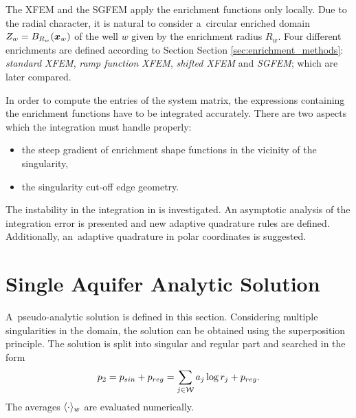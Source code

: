 The XFEM and the SGFEM apply the enrichment functions only locally. 
Due to the radial character, it is natural to consider a~circular enriched domain $Z_w = B_{R_w}(\mathbf{\boldsymbol{x}}_w)$
of the well $w$ given by the enrichment radius $R_w$.
Four different enrichments are defined according to Section Section \ref{sec:enrichment_methods}:
\emph{standard XFEM}, \emph{ramp function XFEM}, \emph{shifted XFEM} and \emph{SGFEM}; which are later compared.


In order to compute the entries of the system matrix, %
the expressions containing the enrichment functions have to be integrated accurately. 
% 
There are two aspects which the integration must handle properly:
\begin{itemize}
  \item the steep gradient of enrichment shape functions in the vicinity of the singularity,
  \item the singularity cut-off edge geometry.
\end{itemize}

The instability in the integration in \cite{gracie_modelling_2010} is investigated.
An asymptotic analysis of the integration error is presented and new adaptive quadrature rules are defined.
Additionally, an~adaptive quadrature in polar coordinates is suggested.

\section{Single Aquifer Analytic Solution} \label{sec:prim_analytic_solution}
A~pseudo-analytic solution is defined in this section. Considering multiple singularities in the domain,
the solution can be obtained using the superposition principle.
The solution is split into singular and regular part and searched in the form
\begin{equation}
p_2 = p_{sin} + p_{reg} = \sum\limits_{j\in\mathcal{W}} a_j\log r_j + p_{reg}. \label{eqn:2d_press_sol_mult}\\
\end{equation}
The averages $\langle\cdot\rangle_w$ are evaluated numerically.
